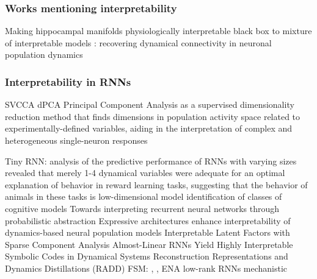\documentclass{article}
\theoremstyle{definition} \newtheorem{definition}{Definition}  \newtheorem{example}{Example}
\theoremstyle{remark} \newtheorem{remark}{Remark}
\newcounter{ct}
\begin{document}
\subsubsection{Works mentioning interpretability}
\citep{whiteway2019interpretable}
\citep{kar2022interpretability}
 Making hippocampal manifolds physiologically interpretable \citep{esparza2023interpretable}
black box to mixture of interpretable models \citep{ghosh2023blackbox}
\citep{schneider2023learnable}
\citep{brenner2024almost}
\citep{menier2025interpretable}
\citep{nonnenmacher2017extracting}
\citep{zhang2025netformer}: recovering dynamical connectivity in neuronal population dynamics
\citep{klindt2023identifying,klindt2025superposition}


\subsubsection{Interpretability in RNNs}
SVCCA\citep{raghu2017svcca}
dPCA\citep{kobak2016demixed} Principal Component Analysis as a supervised dimensionality reduction method that finds dimensions in population activity space related to experimentally-defined variables, aiding in the interpretation of complex and heterogeneous single-neuron responses

Tiny RNN\citep{jian2023tinyrnn}: analysis of the predictive performance of RNNs with varying sizes revealed that merely 1-4 dynamical variables were adequate for an optimal explanation of behavior in reward learning tasks, suggesting that the behavior of animals in these tasks is low-dimensional
model identification of classes of cognitive models\citep{rmus2024artificial}
Towards interpreting recurrent neural networks through probabilistic abstraction \citep{dong2020towards}
Expressive architectures enhance interpretability of dynamics-based neural population models \citep{sedler2023expressive}
Interpretable Latent Factors with Sparse Component Analysis \citep{zimnik2024identifying}
Almost-Linear RNNs Yield Highly Interpretable Symbolic Codes in Dynamical Systems Reconstruction \citep{brenner2024almost}
\citep{he2024multilevel}
\citep{schaeffer2020reverseengineering} Representations and Dynamics Distillations (RADD)
\citep{turner2023simplicity}
FSM: \citep{oliva2019fsm}, \citep{cotteret2024fsm},  ENA \citep{ceni2020interpreting}
low-rank RNNs \citep{beiran2021shaping, valente2022extracting, valente2022probing}
mechanistic \citep{qian2024partial}
\citep{Nassar2018b}
\end{document}
